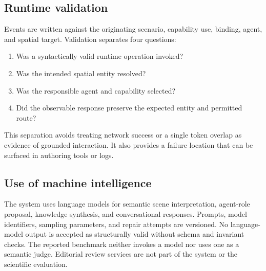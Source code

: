 \subsection{Runtime validation}

Events are written against the originating scenario, capability use, binding,
agent, and spatial target. Validation separates four questions:

\begin{enumerate}
  \item Was a syntactically valid runtime operation invoked?
  \item Was the intended spatial entity resolved?
  \item Was the responsible agent and capability selected?
  \item Did the observable response preserve the expected entity and permitted
  route?
\end{enumerate}

This separation avoids treating network success or a single token overlap as
evidence of grounded interaction. It also provides a failure location that can
be surfaced in authoring tools or logs.

\subsection{Use of machine intelligence}

The system uses language models for semantic scene interpretation, agent-role
proposal, knowledge synthesis, and conversational responses. Prompts, model
identifiers, sampling parameters, and repair attempts are versioned. No
language-model output is accepted as structurally valid without schema and
invariant checks. The reported benchmark neither invokes a model nor uses one
as a semantic judge. Editorial review services are not part of the system or
the scientific evaluation.
